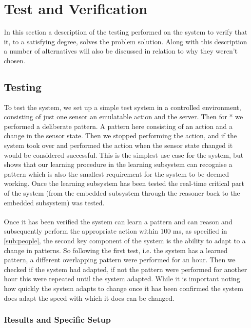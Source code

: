 \chapter{Test and Verification}
In this section a description of the testing performed on the system to verify that it, to a satisfying degree, solves the problem solution. Along with this description a number of alternatives will also be discussed in relation to why they weren't chosen.

\section{Testing}
To test the system, we set up a simple test system in a controlled environment, consisting of just one sensor an emulatable action and the server. Then for * we performed a deliberate pattern. A pattern here consisting of an action and a change in the sensor state. Then we stopped performing the action, and if the system took over and performed the action when the sensor state changed it would be considered successful. This is the simplest use case for the system, but shows that our learning procedure in the learning subsystem can recognise a pattern which is also the smallest requirement for the system to be deemed working. Once the learning subsystem has been tested the real-time critical part of the system (from the embedded subsystem through the reasoner back to the embedded subsystem) was tested.
\\\\
Once it has been verified the system can learn a pattern and can reason and subsequently perform the appropriate action within 100 ms, as specified in \cref{sub:people}, the second key component of the system is the ability to adapt to a change in patterns. So following the first test, i.e. the system has a learned pattern, a different overlapping pattern were performed for an hour. Then we checked if the system had adapted, if not the pattern were performed for another hour this were repeated until the system adapted. While it is important noting how quickly the system adapts to change once it has been confirmed the system does adapt the speed with which it does can be changed.
\subsection{Results and Specific Setup}


